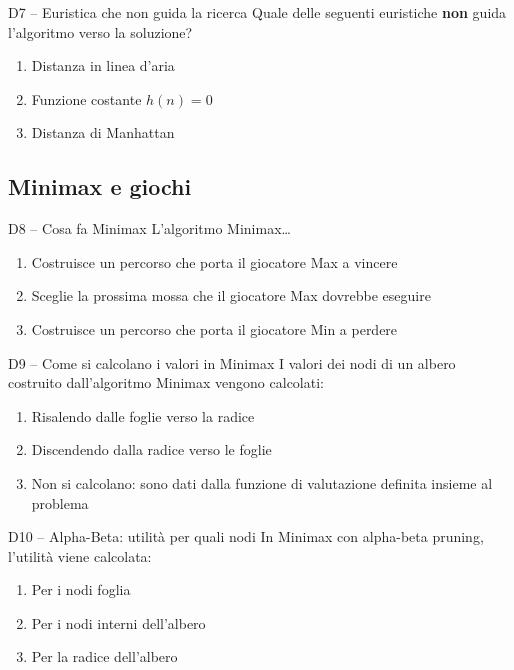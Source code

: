 \documentclass[12pt,a4paper]{article}
\begin{document}
\begin{domanda}{D7 -- Euristica che non guida la ricerca}
Quale delle seguenti euristiche \textbf{non} guida l'algoritmo verso la soluzione?
\begin{enumerate}[label=\alph*.]
  \item Distanza in linea d'aria
  \item Funzione costante $h(n) = 0$
  \item Distanza di Manhattan
\end{enumerate}
\end{domanda}

\subsection{Minimax e giochi}

\begin{domanda}{D8 -- Cosa fa Minimax}
L'algoritmo Minimax\ldots
\begin{enumerate}[label=\alph*.]
  \item Costruisce un percorso che porta il giocatore Max a vincere
  \item Sceglie la prossima mossa che il giocatore Max dovrebbe eseguire
  \item Costruisce un percorso che porta il giocatore Min a perdere
\end{enumerate}
\end{domanda}

\begin{domanda}{D9 -- Come si calcolano i valori in Minimax}
I valori dei nodi di un albero costruito dall'algoritmo Minimax vengono calcolati:
\begin{enumerate}[label=\alph*.]
  \item Risalendo dalle foglie verso la radice
  \item Discendendo dalla radice verso le foglie
  \item Non si calcolano: sono dati dalla funzione di valutazione definita insieme al problema
\end{enumerate}
\end{domanda}

\begin{domanda}{D10 -- Alpha-Beta: utilità per quali nodi}
In Minimax con alpha-beta pruning, l'utilità viene calcolata:
\begin{enumerate}[label=\alph*.]
  \item Per i nodi foglia
  \item Per i nodi interni dell'albero
  \item Per la radice dell'albero
\end{enumerate}
\end{domanda}
\end{document}
